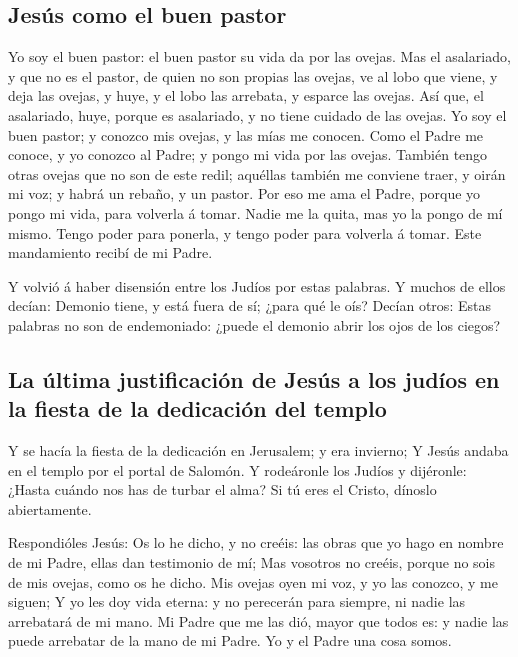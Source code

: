 \hypertarget{jesuxfas-como-el-buen-pastor}{%
\subsection{Jesús como el buen
pastor}\label{jesuxfas-como-el-buen-pastor}}

 Yo soy el buen pastor: el buen pastor su vida da por las
ovejas.  Mas el asalariado, y que no es el pastor, de quien
no son propias las ovejas, ve al lobo que viene, y deja las ovejas, y
huye, y el lobo las arrebata, y esparce las ovejas.  Así
que, el asalariado, huye, porque es asalariado, y no tiene cuidado de
las ovejas.  Yo soy el buen pastor; y conozco mis ovejas, y
las mías me conocen.  Como el Padre me conoce, y yo conozco
al Padre; y pongo mi vida por las ovejas.  También tengo
otras ovejas que no son de este redil; aquéllas también me conviene
traer, y oirán mi voz; y habrá un rebaño, y un pastor.  Por
eso me ama el Padre, porque yo pongo mi vida, para volverla á tomar.
 Nadie me la quita, mas yo la pongo de mí mismo. Tengo
poder para ponerla, y tengo poder para volverla á tomar. Este
mandamiento recibí de mi Padre.

 Y volvió á haber disensión entre los Judíos por estas
palabras.  Y muchos de ellos decían: Demonio tiene, y está
fuera de sí; ¿para qué le oís?  Decían otros: Estas
palabras no son de endemoniado: ¿puede el demonio abrir los ojos de los
ciegos?

\hypertarget{la-uxfaltima-justificaciuxf3n-de-jesuxfas-a-los-juduxedos-en-la-fiesta-de-la-dedicaciuxf3n-del-templo}{%
\subsection{La última justificación de Jesús a los judíos en la fiesta
de la dedicación del
templo}\label{la-uxfaltima-justificaciuxf3n-de-jesuxfas-a-los-juduxedos-en-la-fiesta-de-la-dedicaciuxf3n-del-templo}}

 Y se hacía la fiesta de la dedicación en Jerusalem; y era
invierno;  Y Jesús andaba en el templo por el portal de
Salomón.  Y rodeáronle los Judíos y dijéronle: ¿Hasta
cuándo nos has de turbar el alma? Si tú eres el Cristo, dínoslo
abiertamente.

 Respondióles Jesús: Os lo he dicho, y no creéis: las obras
que yo hago en nombre de mi Padre, ellas dan testimonio de mí;
 Mas vosotros no creéis, porque no sois de mis ovejas, como
os he dicho.  Mis ovejas oyen mi voz, y yo las conozco, y
me siguen;  Y yo les doy vida eterna: y no perecerán para
siempre, ni nadie las arrebatará de mi mano.  Mi Padre que
me las dió, mayor que todos es: y nadie las puede arrebatar de la mano
de mi Padre.  Yo y el Padre una cosa somos.

